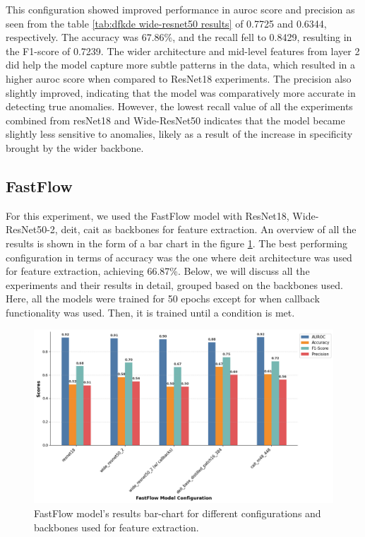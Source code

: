 This configuration showed improved performance in \gls{auroc} score and precision as seen from the table \ref{tab:dfkde wide-resnet50 results} of 0.7725 and 0.6344, respectively. The accuracy was 67.86\%, and the recall fell to 0.8429, resulting in the F1-score of 0.7239. The wider architecture and mid-level features from layer 2 did help the model capture more subtle patterns in the data, which resulted in a higher \gls{auroc} score when compared to ResNet18 experiments. The precision also slightly improved, indicating that the model was comparatively more accurate in detecting true anomalies. However, the lowest recall value of all the experiments combined from resNet18 and Wide-ResNet50 indicates that the model became slightly less sensitive to anomalies, likely as a result of the increase in specificity brought by the wider backbone.

\subsection*{FastFlow}

For this experiment, we used the FastFlow model with ResNet18, Wide-ResNet50-2, \gls{deit}, \gls{cait} as backbones for feature extraction. An overview of all the results is shown in the form of a bar chart in the figure \ref{fig:fastflow model results}. The best performing configuration in terms of accuracy was the one where \gls{deit} architecture was used for feature extraction, achieving 66.87\%. Below, we will discuss all the experiments and their results in detail, grouped based on the backbones used. Here, all the models were trained for 50 epochs except for when callback functionality was used. Then, it is trained until a condition is met.

\begin{figure}[H]
    \centering
    \includegraphics[width=1.2\linewidth]{Rohit_Master_Thesis//Images/fastflow_model_results.png}
    \caption{FastFlow model's results bar-chart for different configurations and backbones used for feature extraction.}
    \label{fig:fastflow model results}
\end{figure}

